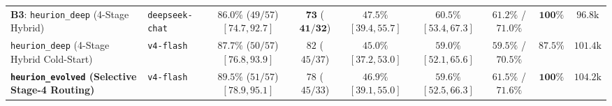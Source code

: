 \documentclass[11pt,a4paper]{article}
\begin{document}
\begin{table}[!t]
{\begin{tabular}{@{}llccccccc@{}}
\midrule
\textbf{B3}: \texttt{heurion\_deep} (4-Stage Hybrid) & \texttt{deepseek-chat} & $86.0\%$ ($49/57$) $[74.7, 92.7]$ & $\mathbf{73}$ ($\mathbf{41}/\mathbf{32}$) & $\mathbf{47.5\%}$ $[39.4, 55.7]$ & $\mathbf{60.5\%}$ $[53.4, 67.3]$ & $61.2\%$ / $71.0\%$ & $\mathbf{100\%}$ & $96.8\text{k}$ \\
\texttt{heurion\_deep} (4-Stage Hybrid Cold-Start) & \texttt{v4-flash} & $87.7\%$ ($50/57$) $[76.8, 93.9]$ & $82$ ($45/37$) & $45.0\%$ $[37.2, 53.0]$ & $59.0\%$ $[52.1, 65.6]$ & $59.5\%$ / $70.5\%$ & $87.5\%$ & $101.4\text{k}$ \\
\textbf{\texttt{heurion\_evolved} (Selective Stage-4 Routing)} & \texttt{v4-flash} & $\mathbf{89.5\%}$ ($51/57$) $[78.9, 95.1]$ & $78$ ($45/33$) & $46.9\%$ $[39.1, 55.0]$ & $59.6\%$ $[52.5, 66.3]$ & $\mathbf{61.5\%}$ / $71.6\%$ & $\mathbf{100\%}$ & $104.2\text{k}$ \\
\bottomrule
\end{tabular}%
}
\end{table}
\end{document}
